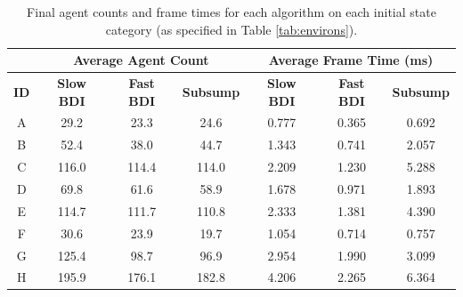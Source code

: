 \documentclass[a4paper,12pt]{article}
\begin{document}
\begin{table}[ht]
\centering
\begin{tabular}{|c|c|c|c|c|c|c|} \hline
& \multicolumn{3}{c|}{\bf Average Agent Count} & \multicolumn{3}{c|}{\bf Average Frame Time (ms)} \\ \hline
{\bf \small ID} & {\bf \small Slow BDI} & {\bf \small Fast BDI} & {\bf \small Subsump} & {\bf \small Slow BDI} & {\bf \small Fast BDI} & {\bf \small Subsump} \\ \hline
A & 29.2 & 23.3 & 24.6 & 0.777 & 0.365 & 0.692 \\
B & 52.4 & 38.0 & 44.7 & 1.343 & 0.741 & 2.057 \\
C & 116.0 & 114.4 & 114.0 & 2.209 & 1.230 & 5.288 \\ \hline
D & 69.8 & 61.6 & 58.9 & 1.678 & 0.971 & 1.893 \\
E & 114.7 & 111.7 & 110.8 & 2.333 & 1.381 & 4.390 \\
F & 30.6 & 23.9 & 19.7 & 1.054 & 0.714 & 0.757 \\
G & 125.4 & 98.7 & 96.9 & 2.954 & 1.990 & 3.099 \\
H & 195.9 & 176.1 & 182.8 & 4.206 & 2.265 & 6.364 \\ \hline
\end{tabular}
\caption{Final agent counts and frame times for each algorithm on each initial state category (as specified in Table \ref{tab:environs}).}
\label{tab:results}
\vspace{-20mm}
\end{table}
\end{document}
